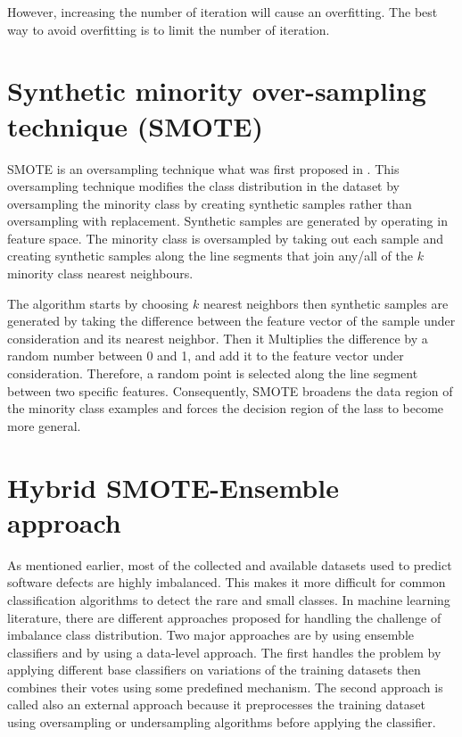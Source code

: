\documentclass[runningheads,a4paper]{llncs}
\begin{document}
However, increasing the number of iteration will cause an overfitting. The best way to avoid overfitting is to limit the number of iteration.

\section{Synthetic minority over-sampling technique (SMOTE)}
\label{SMOTTE}

SMOTE is an oversampling technique what was first proposed in \cite{chawla2002smote}. This oversampling technique modifies the class distribution in the dataset by oversampling the minority class by creating synthetic samples rather than oversampling with replacement. Synthetic samples are generated by operating in feature space.
The minority class is oversampled by taking out each sample and creating synthetic samples along the line segments that join any/all of the $k$ minority class nearest neighbours. 

The algorithm starts by choosing $k$ nearest neighbors then synthetic samples
are generated by taking the difference between the feature vector of the sample
under consideration and its nearest neighbor. Then it Multiplies the difference by a random number between 0 and 1, and add it to the feature vector under consideration. Therefore, a random point is selected along the line segment between two specific features. Consequently, SMOTE broadens the data region of the minority class examples and forces the decision region of the lass to become more general.

\section{Hybrid SMOTE-Ensemble approach}
\label{SMOTE-Ensemble}

As mentioned earlier, most of the collected and available datasets used to predict software defects are highly imbalanced. This makes it more difficult for common classification algorithms to detect the rare and small classes. In machine learning literature, there are different approaches proposed for handling the challenge of imbalance class distribution. Two major approaches are by using ensemble classifiers and by using a data-level approach. The first handles the problem by applying different base classifiers on variations of the training datasets then combines their votes using some predefined mechanism. The second approach is called also an external approach because it preprocesses the training dataset using oversampling or undersampling algorithms before applying the classifier. 
\end{document}
